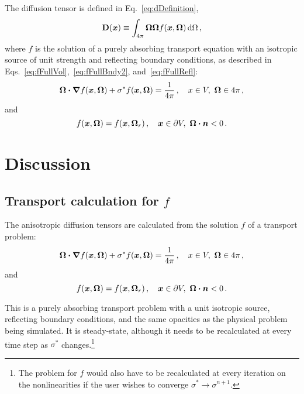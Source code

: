 The diffusion tensor is defined in Eq.~\eqref{eq:dDefinition},
\begin{equation*}
  \mathbf{D}(\bm{x}) \equiv \int_{4\pi} \bm{\Omega} \bm{\Omega}
  f(\bm{x}, \bm{\Omega}) \mathop{}\!\mathrm{d}\Omega \,,
\end{equation*}
where $f$ is the solution of a purely absorbing transport equation with an
isotropic source of unit strength and reflecting boundary conditions, as
described in Eqs.~\eqref{eq:fFullVol},~\eqref{eq:fFullBndy2}, and~\eqref{eq:fFullRefl}:
\begin{equation*}
    \bm{\Omega}\bm{\cdot} \bm{\nabla} f(\bm{x}, \bm{\Omega})
    + \sigma^\ast f (\bm{x}, \bm{\Omega})
  = \frac{1}{4\pi} \,, \quad x \in V,\ \bm{\Omega} \in 4\pi\,,
\end{equation*}
and
\begin{equation*}
  f(\bm{x}, \bm{\Omega}) = f(\bm{x}, \bm{\Omega}_r) \,,
 \quad \bm{x} \in \partial V, \ \bm{\Omega} \bm{\cdot} \bm{n} < 0\,.
\end{equation*}

\section{Discussion}

\subsection{Transport calculation for $f$}

The anisotropic diffusion tensors are calculated from the solution $f$ of a
transport problem:
\begin{equation*}
    \bm{\Omega}\bm{\cdot} \bm{\nabla} f(\bm{x}, \bm{\Omega})
    + \sigma^\ast f (\bm{x}, \bm{\Omega})
  = \frac{1}{4\pi} \,, \quad x \in V,\ \bm{\Omega} \in 4\pi\,,
\end{equation*}
and
\begin{equation*}
  f(\bm{x}, \bm{\Omega}) = f(\bm{x}, \bm{\Omega}_r) \,,
 \quad \bm{x} \in \partial V, \ \bm{\Omega} \bm{\cdot} \bm{n} < 0\,.
\end{equation*}

This is a purely absorbing transport problem with a unit isotropic source,
reflecting boundary conditions, and the same opacities as the physical problem
being simulated. It is steady-state, although it needs to be recalculated at
every time step as $\sigma^*$ changes.\footnote{The problem for $f$ would also
have to be recalculated at every iteration on the nonlinearities if the user
wishes to converge $\sigma^* \to \sigma^{n+1}$.}

